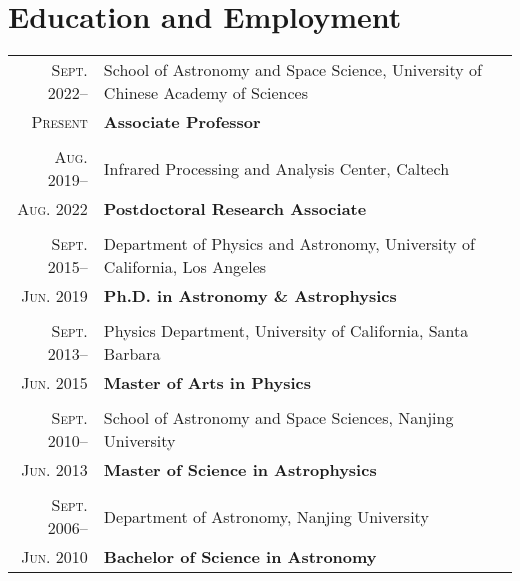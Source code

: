 \documentclass[letterpaper,10pt]{article}
\newcommand{\narrow}{-1.8ex}
\begin{document}
\section{Education and Employment}
\vspace*{1ex}
\begin{tabular}{r|p{5.7in}}
    \textsc{Sept. 2022}--     &   School of Astronomy and Space Science, University of Chinese Academy of Sciences  \\
    \textsc{Present}          &   \hfill\textbf{Associate Professor}    \\
    \multicolumn{2}{c}{} \\[\narrow]
    \textsc{Aug. 2019}--      &   Infrared Processing and Analysis Center, Caltech \\
    \textsc{Aug. 2022}        &   \hfill\textbf{Postdoctoral Research Associate}    \\
    \multicolumn{2}{c}{} \\[\narrow]
    \textsc{Sept. 2015}--     &   Department of Physics and Astronomy, University of California, Los Angeles \\
    \textsc{Jun. 2019}        &   \hfill\textbf{Ph.D. in Astronomy \& Astrophysics} \\
    \multicolumn{2}{c}{} \\[\narrow]
    \textsc{Sept. 2013}--     &   Physics Department, University of California, Santa Barbara     \\
    \textsc{Jun. 2015}        &   \hfill\textbf{Master of Arts in Physics}      \\
    \multicolumn{2}{c}{} \\[\narrow]
    \textsc{Sept. 2010}--     &   School of Astronomy and Space Sciences, Nanjing University      \\
    \textsc{Jun. 2013}        &   \hfill\textbf{Master of Science in Astrophysics}      \\
    \multicolumn{2}{c}{} \\[\narrow]
    \textsc{Sept. 2006}--     &   Department of Astronomy, Nanjing University \\
    \textsc{Jun. 2010}        &   \hfill\textbf{Bachelor of Science in Astronomy}
\end{tabular}
\end{document}
